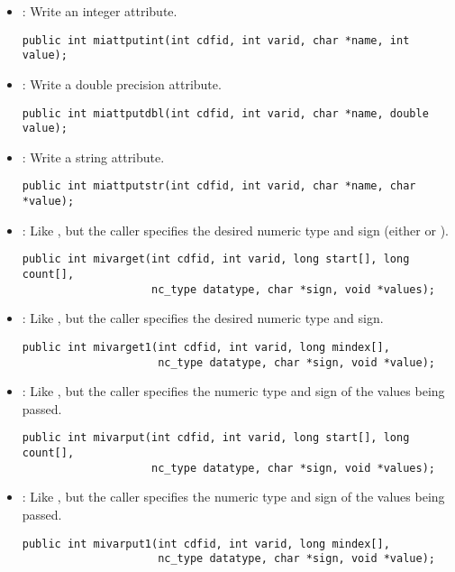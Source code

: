 \begin{itemize}
\item {} : Write an integer attribute.
\begin{verbatim}
public int miattputint(int cdfid, int varid, char *name, int value);
\end{verbatim}

\item {} : Write a double precision attribute.
\begin{verbatim}
public int miattputdbl(int cdfid, int varid, char *name, double value);
\end{verbatim}

\item {} : Write a string attribute.
\begin{verbatim}
public int miattputstr(int cdfid, int varid, char *name, char *value);
\end{verbatim}

\item {} : Like , but the caller specifies
the desired numeric type and sign (either  or
).
\begin{verbatim}
public int mivarget(int cdfid, int varid, long start[], long count[],
                    nc_type datatype, char *sign, void *values);
\end{verbatim}

\item {} : Like , but the caller
specifies the desired numeric type and sign.
\begin{verbatim}
public int mivarget1(int cdfid, int varid, long mindex[],
                     nc_type datatype, char *sign, void *value);
\end{verbatim}

\item {} : Like , but the caller specifies
the numeric type and sign of the values being passed.
\begin{verbatim}
public int mivarput(int cdfid, int varid, long start[], long count[],
                    nc_type datatype, char *sign, void *values);
\end{verbatim}

\item {} : Like , but the caller specifies
the numeric type and sign of the values being passed.
\begin{verbatim}
public int mivarput1(int cdfid, int varid, long mindex[],
                     nc_type datatype, char *sign, void *value);
\end{verbatim}


\end{itemize}
